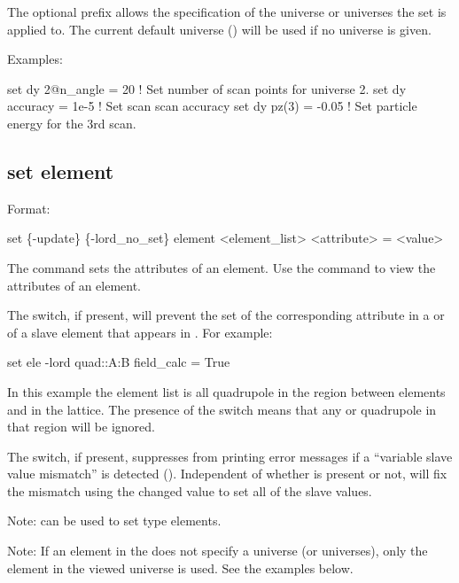 {{The optional  prefix allows the specification of the universe or universes the set is applied
to. The current default universe () will be used if no universe is given.

Examples:
\begin{example}
  set dy 2@n_angle = 20   ! Set number of scan points for universe 2.
  set dy accuracy = 1e-5  ! Set scan scan accuracy
  set dy pz(3) = -0.05    ! Set particle energy for the 3rd scan.
\end{example}


\subsection{set element}
\label{s:set.element}

Format:
\begin{example}
  set \{-update\} \{-lord_no_set\} element <element_list> <attribute> = <value>
\end{example}

The  command sets the attributes of an element. Use the 
command to view the attributes of an element.

The  switch, if present, will prevent the set of the corresponding attribute in a
 or  of a slave element that appears in . For
example:
\begin{example}
  set ele -lord quad::A:B field_calc = True
\end{example}
In this example the element list is all quadrupole in the region between elements  and 
in the lattice. The presence of the  switch means that any  or
 quadrupole in that region will be ignored.

The  switch, if present, suppresses \tao from printing error messages if a ``variable
slave value mismatch'' is detected (). Independent of whether  is
present or not, \tao will fix the mismatch using the changed value to set all of the slave values.

Note:  can be used to set  type elements.

Note: If an element in the  does not specify a universe (or universes),
only the element in the viewed universe is used. See the examples below.

}}
